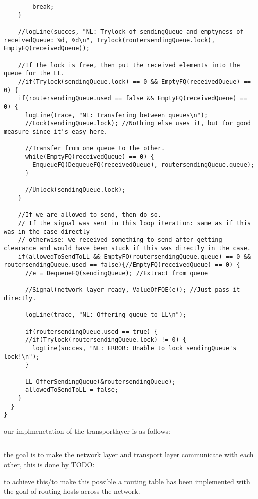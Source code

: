 \begin{lstlisting}
        break;
    }

    //logLine(succes, "NL: Trylock of sendingQueue and emptyness of receivedQueue: %d, %d\n", Trylock(routersendingQueue.lock), EmptyFQ(receivedQueue));

    //If the lock is free, then put the received elements into the queue for the LL.
    //if(Trylock(sendingQueue.lock) == 0 && EmptyFQ(receivedQueue) == 0) {
    if(routersendingQueue.used == false && EmptyFQ(receivedQueue) == 0) {
      logLine(trace, "NL: Transfering between queues\n");
      //Lock(sendingQueue.lock); //Nothing else uses it, but for good measure since it's easy here.

      //Transfer from one queue to the other.
      while(EmptyFQ(receivedQueue) == 0) {
        EnqueueFQ(DequeueFQ(receivedQueue), routersendingQueue.queue);
      }

      //Unlock(sendingQueue.lock);
    }

    //If we are allowed to send, then do so.
    // If the signal was sent in this loop iteration: same as if this was in the case directly
    // otherwise: we received something to send after getting clearance and would have been stuck if this was directly in the case.
    if(allowedToSendToLL && EmptyFQ(routersendingQueue.queue) == 0 && routersendingQueue.used == false){//EmptyFQ(receivedQueue) == 0) {
      //e = DequeueFQ(sendingQueue); //Extract from queue

      //Signal(network_layer_ready, ValueOfFQE(e)); //Just pass it directly.

      logLine(trace, "NL: Offering queue to LL\n");

      if(routersendingQueue.used == true) {
      //if(Trylock(routersendingQueue.lock) != 0) {
        logLine(succes, "NL: ERROR: Unable to lock sendingQueue's lock!\n");
      }

      LL_OfferSendingQueue(&routersendingQueue);
      allowedToSendToLL = false;
    }
  }
}
\end{lstlisting}



our implmenetation of the transportlayer is as follows:

\begin{lstlisting}
\end{lstlisting}

the goal is to make the network layer and transport layer communicate with each other, this is done by TODO:


to achieve this/to make this possible a routing table has been implemented with the goal of routing hosts across the network.

